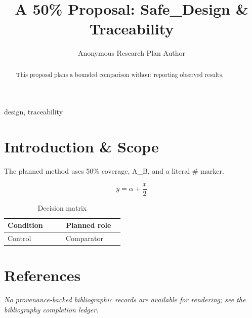 \documentclass[conference]{IEEEtran}
\begin{document}
\title{A 50\% Proposal: Safe\_Design \& Traceability}\author{Anonymous Research Plan Author}\maketitle

\begin{abstract}
This proposal plans a bounded comparison without reporting observed results.
\end{abstract}
\begin{IEEEkeywords}
design, traceability
\end{IEEEkeywords}\section{Introduction \& Scope}
The planned method uses 50\% coverage, A\_B, and a literal \# marker.

\begin{equation}
y = \alpha + \frac{x}{2}
\label{eq:introduction-B2}
\end{equation}

\begin{table}[htbp]
\centering
\small


\caption{Decision matrix}
\label{tab:introduction-B3}
\begin{tabular}{|p{0.45\linewidth}|p{0.45\linewidth}|}
\hline
Condition & Planned role \\\hline
Control & Comparator \\\hline
\end{tabular}
\end{table}\section*{References}
\emph{No provenance-backed bibliographic records are available for rendering; see the bibliography completion ledger.}
\end{document}
